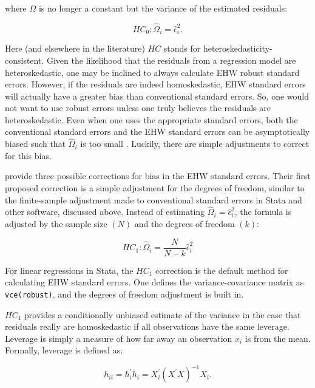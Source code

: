 \documentclass[11pt]{article}
\begin{document}
\noindent where $\Omega$ is no longer a constant but the variance of the estimated residuals:

\begin{equation}
    HC_{0}: \hat{\Omega}_{i} = \hat{\epsilon}_{i}^{2}.
\end{equation}

\noindent Here (and elsewhere in the literature) $HC$ stands for heteroskedasticity-consistent. Given the likelihood that the residuals from a regression model are heteroskedastic, one may be inclined to always calculate EHW robust standard errors. However, if the residuals are indeed homoskedastic, EHW standard errors will actually have a greater bias than conventional standard errors. So, one would not want to use robust errors unless one truly believes the residuals are heteroskedastic. Even when one uses the appropriate standard errors, both the conventional standard errors and the EHW standard errors can be asymptotically biased such that $\hat{\Omega}_i$ is too small \citep{angrist_mostly_2009}. Luckily, there are simple adjustments to correct for this bias. 

\cite{mackinnon_heteroskedasticity-consistent_1985} provide three possible corrections for bias in the EHW standard errors. Their first proposed correction is a simple adjustment for the degrees of freedom, similar to the finite-sample adjustment made to conventional standard errors in Stata and other software, discussed above. Instead of estimating $\hat{\Omega}_i = \hat{\epsilon}_{i}^{2}$, the formula is adjusted by the sample size $(N)$ and the degrees of freedom $(k)$:

\begin{equation}
    HC_1 : \hat{\Omega}_i = \frac{N}{N-k} \hat{\epsilon}_{i}^{2}
\end{equation}

\noindent For linear regressions in Stata, the $HC_1$ correction is the default method for calculating EHW standard errors. One defines the variance-covariance matrix as \texttt{vce(robust)}, and the degrees of freedom adjustment is built in.

$HC_1$ provides a conditionally unbiased estimate of the variance in the case that  residuals really are homoskedastic if all observations have the same leverage. Leverage is simply a measure of how far away an observation $x_i$ is from the mean. Formally, leverage is defined as:

\begin{equation}
    h_{ii} = h_{i}^{'} h_{i} = X_{i}^{'} \left( X^{'} X \right)^{-1} X_{i}.
\end{equation}
\end{document}

